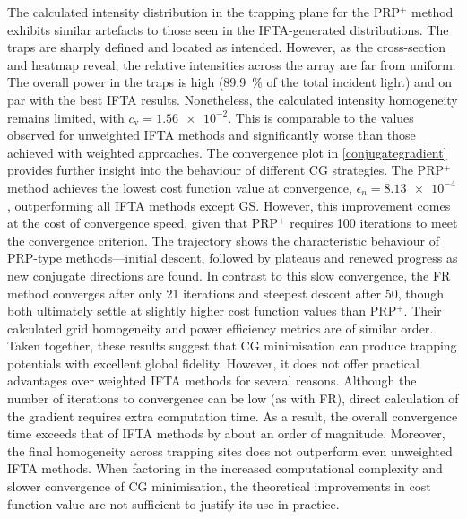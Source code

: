 \documentclass[../Thesis-IJspeert.tex]{subfiles}
\begin{document}
The calculated intensity distribution in the trapping plane for the PRP$^+$ method exhibits similar artefacts to those seen in the IFTA-generated distributions. The traps are sharply defined and located as intended. However, as the cross-section and heatmap reveal, the relative intensities across the array are far from uniform. The overall power in the traps is high (\SI{89.9}{\percent} of the total incident light) and on par with the best IFTA results. Nonetheless, the calculated intensity homogeneity remains limited, with $c_\mathrm{v} = \num{1.56e-2}$. This is comparable to the values observed for unweighted IFTA methods and significantly worse than those achieved with weighted approaches. The convergence plot in \autoref{conjugategradient} provides further insight into the behaviour of different CG strategies. The PRP$^+$ method achieves the lowest cost function value at convergence, $ \epsilon_n = \num{8.13e-4}$, outperforming all IFTA methods except GS. However, this improvement comes at the cost of convergence speed, given that PRP$^+$ requires \num{100} iterations to meet the convergence criterion. The trajectory shows the characteristic behaviour of PRP-type methods---initial descent, followed by plateaus and renewed progress as new conjugate directions are found. In contrast to this slow convergence, the FR method converges after only \num{21} iterations and steepest descent after \num{50}, though both ultimately settle at slightly higher cost function values than PRP$^+$. Their calculated grid homogeneity and power efficiency metrics are of similar order. Taken together, these results suggest that CG minimisation can produce trapping potentials with excellent global fidelity. However, it does not offer practical advantages over weighted IFTA methods for several reasons. Although the number of iterations to convergence can be low (as with FR), direct calculation of the gradient requires extra computation time. As a result, the overall convergence time exceeds that of IFTA methods by about an order of magnitude. Moreover, the final homogeneity across trapping sites does not outperform even unweighted IFTA methods. When factoring in the increased computational complexity and slower convergence of CG minimisation, the theoretical improvements in cost function value are not sufficient to justify its use in practice.
\end{document}
